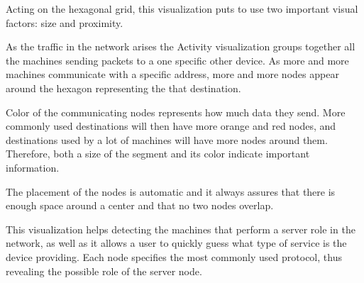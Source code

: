 Acting on the hexagonal grid, this visualization puts to use two important visual factors:
size and proximity.

As the traffic in the network arises the Activity visualization groups together all the machines
sending packets to a one specific other device. As more and more machines communicate with a specific
address, more and more nodes appear around the hexagon representing the that destination.

Color of the communicating nodes represents how much data they send. More commonly used destinations 
will then have more orange and red nodes, and destinations used by a lot of machines will have more
nodes around them. Therefore, both a size of the segment and its color indicate important information.

The placement of the nodes is automatic and it always assures that there is enough space around a center
and that no two nodes overlap.

This visualization helps detecting the machines that perform a server role in the network, as well as
it allows a user to quickly guess what type of service is the device providing. Each node specifies the
most commonly used protocol, thus revealing the possible role of the server node.
